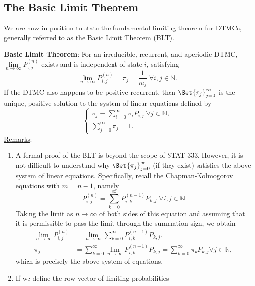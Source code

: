 \subsection*{The Basic Limit Theorem}
We are now in position to state the fundamental limiting theorem for DTMCs, generally
referred to as the Basic Limit Theorem (BLT).
\begin{Result}
    \textbf{Basic Limit Theorem}: For an irreducible, recurrent, and aperiodic DTMC, $ \lim\limits_{{n} \to {\infty}} P_{i,j}^{(n)} $
    exists and is independent of state $ i $, satisfying
    \[ \lim\limits_{{n} \to {\infty}} P_{i,j}^{(n)}=\pi_j=\frac{1}{m_j}\;\forall i,j\in\mathbb{N}. \]
    If the DTMC also happens to be positive recurrent, then $ \Set{\pi_j}_{j=0}^\infty $ is the unique, positive
    solution to the system of linear equations defined by
    \[ \begin{cases}
            \pi_j=\sum_{i=0}^{\infty} \pi_i P_{i,j}\;\forall j\in\mathbb{N}, \\
            \sum_{j=0}^{\infty} \pi_j=1.
        \end{cases} \]
    \tcblower{}
    \underline{Remarks}:
    \begin{enumerate}[(1)]
        \item A formal proof of the BLT is beyond the scope of STAT 333. However, it is not difficult
              to understand why $ \Set{\pi_j}_{j=0}^\infty $ (if they exist) satisfies the above system of linear equations.
              Specifically, recall the Chapman-Kolmogorov equations with $m = n - 1$, namely
              \[ P_{i, j}^{(n)}=\sum_{k=0}^{\infty} P_{i, k}^{(n-1)} P_{k, j}\; \forall i, j \in \mathbb{N} \]
              Taking the limit as $ n\to\infty $ of both sides of this equation and assuming that it is
              permissible to pass the limit through the summation sign, we obtain
              \begin{align*}
                  \lim _{n \to \infty} P_{i, j}^{(n)} & =\lim _{n \to \infty} \sum_{k=0}^{\infty} P_{i, k}^{(n-1)} P_{k, j}.                                                               \\
                  \pi_{j}                             & =\sum_{k=0}^{\infty} \lim _{n \to \infty} P_{i, k}^{(n-1)} P_{k, j}=\sum_{k=0}^{\infty} \pi_{k} P_{k, j} \forall j \in \mathbb{N},
              \end{align*}
              which is precisely the above system of equations.
        \item If we define the row vector of limiting probabilities

\end{enumerate}
\end{Result}
